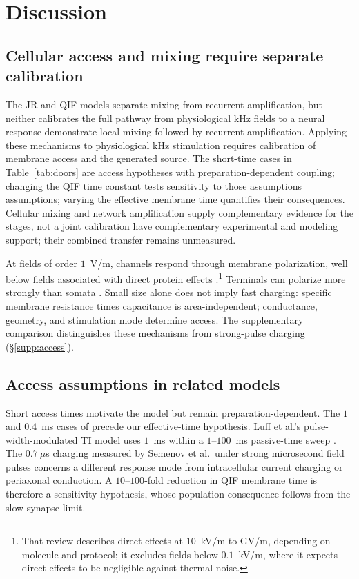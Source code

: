 \documentclass[11pt,a4paper]{article}
\newif\ifjne
\providecommand{\DIFaddtex}[1]{{\protect\color{blue} \sf #1}} %
\providecommand{\DIFdeltex}[1]{{\protect\color{red} \scriptsize #1}} %
\providecommand{\DIFaddbegin}{} %
\providecommand{\DIFaddend}{} %
\providecommand{\DIFdelbegin}{} %
\providecommand{\DIFdelend}{} %
\providecommand{\DIFadd}[1]{\texorpdfstring{\DIFaddtex{#1}}{#1}} %
\providecommand{\DIFdel}[1]{\texorpdfstring{\DIFdeltex{#1}}{}} %
\begin{document}
\DIFaddbegin \FloatBarrier
\DIFaddend \section{Discussion}\label{sec:discussion}
\subsection{Cellular access and mixing require separate calibration}
The JR and QIF models \DIFdelbegin \DIFdel{separate mixing from recurrent
amplification, but neither
calibrates the full pathway from physiological kHz fields to a neural response}\DIFdelend \DIFaddbegin \DIFadd{demonstrate local mixing followed by recurrent
amplification. Applying these mechanisms to physiological kHz stimulation
requires calibration of membrane access and the generated source}\DIFaddend . The short-time
cases in Table~\ref{tab:doors} are access \DIFdelbegin \DIFdel{hypotheses with
preparation-dependent coupling; changing the QIF time constant tests sensitivity
to those assumptions}\DIFdelend \DIFaddbegin \DIFadd{assumptions; varying the effective
membrane time quantifies their consequences}\DIFaddend . Cellular mixing \cite{mirzakhalili2020,luff2024mixer} and network
amplification \cite{caldas2024,karimi2024,esmaeilpour2021} \DIFdelbegin \DIFdel{supply
complementary
evidence for the stages, not a joint calibration}\DIFdelend \DIFaddbegin \DIFadd{have complementary
experimental and modeling support; their combined transfer remains unmeasured}\DIFaddend .

At fields of order $1$~V/m, channels respond through membrane polarization,
well below fields associated with direct protein effects
\cite{cifra2026}.\footnote{That review describes direct effects at $10$~kV/m
to GV/m, depending on molecule and protocol; it excludes fields below
$0.1$~kV/m, where it expects direct effects to be negligible against thermal noise.}
Terminals can polarize more strongly than somata
\cite{rahman2013,aberra2023,chakraborty2018}. Small size alone does not imply
fast charging: specific membrane resistance times capacitance is area-independent;
conductance, geometry, and stimulation mode determine access. The supplementary
comparison distinguishes these mechanisms from strong-pulse charging
(\S\ref{supp:access}).
\ifjne\else
\subsection{Access assumptions in related models}
Short access times motivate the model but remain preparation-dependent.
The $1$ and $0.4$~ms cases of \cite{esmaeilpour2021} precede our effective-time
hypothesis. Luff et al.'s pulse-width-modulated TI model uses $1$~ms within a
$1$--$100$~ms passive-time sweep \cite{luff2024}. The $0.7~\mu$s charging
measured by Semenov et al.\ under strong microsecond field pulses
\cite{semenov2025} concerns a different response mode from intracellular
current charging or periaxonal conduction. A $10$--$100$-fold reduction in
QIF membrane time is therefore a sensitivity hypothesis, whose population
consequence follows from the slow-synapse limit.
\end{document}
